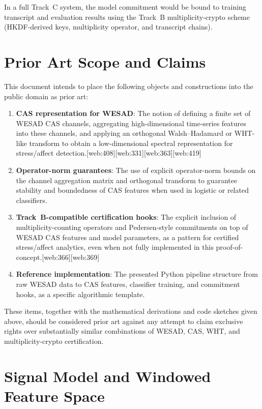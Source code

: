 \documentclass[11pt]{article}
\begin{document}
In a full Track~C system, the model commitment would be bound to training transcript and evaluation results using the Track~B multiplicity-crypto scheme (HKDF-derived keys, multiplicity operator, and transcript chains).

\section{Prior Art Scope and Claims}

This document intends to place the following objects and constructions into the public domain as prior art:

\begin{enumerate}
  \item \textbf{CAS representation for WESAD}: The notion of defining a finite set of WESAD CAS channels, aggregating high-dimensional time-series features into these channels, and applying an orthogonal Walsh--Hadamard or WHT-like transform to obtain a low-dimensional spectral representation for stress/affect detection.\cite{Schmidt2018_WESAD,WHTOverview,WHTOrthogonal}[web:408][web:331][web:363][web:419]
  \item \textbf{Operator-norm guarantees}: The use of explicit operator-norm bounds on the channel aggregation matrix and orthogonal transform to guarantee stability and boundedness of CAS features when used in logistic or related classifiers.
  \item \textbf{Track~B-compatible certification hooks}: The explicit inclusion of multiplicity-counting operators and Pedersen-style commitments on top of WESAD CAS features and model parameters, as a pattern for certified stress/affect analytics, even when not fully implemented in this proof-of-concept.\cite{Pedersen_ZKDocs,Pedersen_RareSkills}[web:366][web:369]
  \item \textbf{Reference implementation}: The presented Python pipeline structure from raw WESAD data to CAS features, classifier training, and commitment hooks, as a specific algorithmic template.
\end{enumerate}

These items, together with the mathematical derivations and code sketches given above, should be considered prior art against any attempt to claim exclusive rights over substantially similar combinations of WESAD, CAS, WHT, and multiplicity-crypto certification.

\appendix

\section{Signal Model and Windowed Feature Space}
\end{document}
